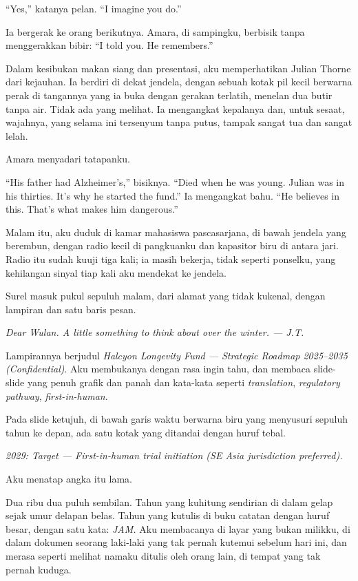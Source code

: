 \documentclass[11pt,twoside,openany]{book}
\makeatletter
\newcommand{\scenebreak}{\par\vspace{0.9em}{\centering\textsc{*\hspace{0.7em}*\hspace{0.7em}*}\par}\vspace{0.9em}\@afterindentfalse\@afterheading}
\makeatother
\begin{document}
``Yes,'' katanya pelan. ``I imagine you do.''

Ia bergerak ke orang berikutnya. Amara, di sampingku, berbisik tanpa menggerakkan bibir: ``I told you. He remembers.''

Dalam kesibukan makan siang dan presentasi, aku memperhatikan Julian Thorne dari kejauhan. Ia berdiri di dekat jendela, dengan sebuah kotak pil kecil berwarna perak di tangannya yang ia buka dengan gerakan terlatih, menelan dua butir tanpa air. Tidak ada yang melihat. Ia mengangkat kepalanya dan, untuk sesaat, wajahnya, yang selama ini tersenyum tanpa putus, tampak sangat tua dan sangat lelah.

Amara menyadari tatapanku.

``His father had Alzheimer's,'' bisiknya. ``Died when he was young. Julian was in his thirties. It's why he started the fund.'' Ia mengangkat bahu. ``He believes in this. That's what makes him dangerous.''

\scenebreak
Malam itu, aku duduk di kamar mahasiswa pascasarjana, di bawah jendela yang berembun, dengan radio kecil di pangkuanku dan kapasitor biru di antara jari. Radio itu sudah kuuji tiga kali; ia masih bekerja, tidak seperti ponselku, yang kehilangan sinyal tiap kali aku mendekat ke jendela.

Surel masuk pukul sepuluh malam, dari alamat yang tidak kukenal, dengan lampiran dan satu baris pesan.

\emph{Dear Wulan. A little something to think about over the winter. --- J.T.}

Lampirannya berjudul \emph{Halcyon Longevity Fund --- Strategic Roadmap 2025--2035 (Confidential)}. Aku membukanya dengan rasa ingin tahu, dan membaca slide-slide yang penuh grafik dan panah dan kata-kata seperti \emph{translation}, \emph{regulatory pathway}, \emph{first-in-human}.

Pada slide ketujuh, di bawah garis waktu berwarna biru yang menyusuri sepuluh tahun ke depan, ada satu kotak yang ditandai dengan huruf tebal.

\emph{2029: Target --- First-in-human trial initiation (SE Asia jurisdiction preferred).}

Aku menatap angka itu lama.

Dua ribu dua puluh sembilan. Tahun yang kuhitung sendirian di dalam gelap sejak umur delapan belas. Tahun yang kutulis di buku catatan dengan huruf besar, dengan satu kata: \emph{JAM.} Aku membacanya di layar yang bukan milikku, di dalam dokumen seorang laki-laki yang tak pernah kutemui sebelum hari ini, dan merasa seperti melihat namaku ditulis oleh orang lain, di tempat yang tak pernah kuduga.
\end{document}
